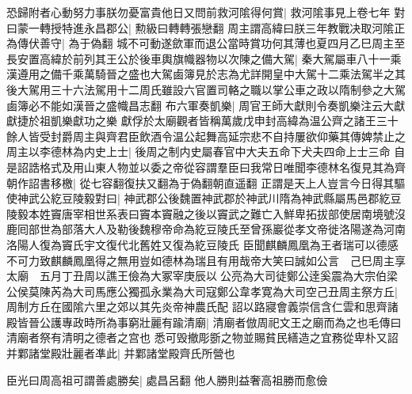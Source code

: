 恐歸附者心動努力事朕勿憂富貴他日又問前救河隂得何賞|{
	救河隂事見上卷七年}
對曰蒙一轉授特進永昌郡公|{
	勲級曰轉轉張戀翻}
周主謂高緯曰朕三年教戰决取河隂正為傳伏善守|{
	為于偽翻}
城不可動遂歛軍而退公當時賞功何其薄也夏四月乙巳周主至長安置高緯於前列其王公於後車輿旗幟器物以次陳之備大駕|{
	秦大駕屬車八十一乘漢遵用之備千乘萬騎晉之盛也大駕鹵簿見於志為尤詳開皇中大駕十二乘法駕半之其後大駕用三十六法駕用十二周氏雖設六官置司輅之職以掌公車之政以隋制參之大駕鹵簿必不能如漢晉之盛幟昌志翻}
布六軍奏凱樂|{
	周官王師大獻則令奏凱樂注云大獻獻捷於祖凱樂獻功之樂}
獻俘於太廟觀者皆稱萬歲戊申封高緯為温公齊之諸王三十餘人皆受封爵周主與齊君臣飲酒令温公起舞高延宗悲不自持屢欲仰藥其傳婢禁止之周主以李德林為内史上士|{
	後周之制内史屬春官中大夫五命下犬夫四命上士三命}
自是詔誥格式及用山東人物並以委之帝從容謂羣臣曰我常日唯聞李德林名復見其為齊朝作詔書移檄|{
	從七容翻復扶又翻為于偽翻朝直遥翻}
正謂是天上人豈言今日得其驅使神武公紇豆陵毅對曰|{
	神武郡公後魏置神武郡於神武川隋為神武縣屬馬邑郡紇豆陵毅本姓竇唐宰相世系表曰竇本竇融之後以竇武之難亡入鮮卑拓拔部使居南境號沒鹿囘部世為部落大人及勒後魏穆帝命為紇豆陵氏至曾孫巖從孝文帝徙洛陽遂為河南洛陽人復為竇氏宇文復代北舊姓又復為紇豆陵氏}
臣聞麒麟鳳凰為王者瑞可以德感不可力致麒麟鳳凰得之無用豈如德林為瑞且有用哉帝大笑曰誠如公言　己巳周主享太廟　五月丁丑周以譙王儉為大冢宰庚辰以公亮為大司徒鄭公逹奚震為大宗伯梁公侯莫陳芮為大司馬應公獨孤永業為大司寇鄭公韋孝寛為大司空己丑周主祭方丘|{
	周制方丘在國隂六里之郊以其先炎帝神農氏配}
詔以路寢會義崇信含仁雲和思齊諸殿皆晉公護專政時所為事窮壯麗有踰清廟|{
	清廟者倣周祀文王之廟而為之也毛傳曰清廟者祭有清明之德者之宫也}
悉可毁撤彫斵之物並賜貧民繕造之宜務從卑朴又詔并鄴諸堂殿壯麗者凖此|{
	并鄴諸堂殿齊氏所營也}


臣光曰周高祖可謂善處勝矣|{
	處昌呂翻}
他人勝則益奢高祖勝而愈儉

